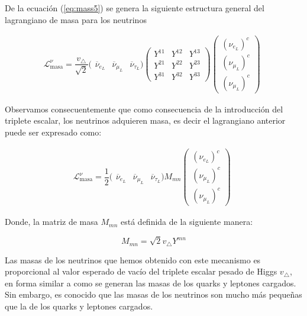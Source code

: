 \documentclass[12pt]{article}
\begin{document}
De la ecuación (\ref{eq:mass5}) se genera la siguiente estructura general del lagrangiano de masa para los neutrinos

\begin{equation*}
    \mathcal{L}^\nu_{\text{masa}}= \frac{v_\triangle}{\sqrt{2}} (\begin{array}{ccc}
         \overline{\nu}_{e_L} & \overline{\nu}_{\mu_L} & \overline{\nu}_{\tau_L} )\begin{pmatrix}    Y^{11} &  Y^{12} & Y^{13} \\
         Y^{21} &  Y^{22} & Y^{23}  \\
         Y^{31} &  Y^{32} & Y^{33}  \end{pmatrix}
  \begin{pmatrix}
         (\nu_{e_L})^c \\
         (\nu_{\mu_L})^c \\
         (\nu_{\mu_L})^c 
    \end{pmatrix}
    \end{array}
    \label{eq:mass1}
\end{equation*} 

Observamos consecuentemente que como consecuencia de la introducción del triplete escalar, los neutrinos adquieren masa, es decir el lagrangiano anterior puede ser expresado como:  

\begin{equation}
    \mathcal{L}^\nu_{\text{masa}}= \frac{1}{2} (\begin{array}{ccc}
         \overline{\nu}_{e_L} & \overline{\nu}_{\mu_L} & \overline{\nu}_{\tau_L} )M_{mn}    \begin{pmatrix}
         (\nu_{e_L})^c \\
         (\nu_{\mu_L})^c \\
         (\nu_{\mu_L})^c 
    \end{pmatrix}
    \end{array}
    \label{eq:mss2}
\end{equation} 

Donde, la matriz de masa \(M_{mn} \) está definida de la siguiente manera: 

\[M_{mn} = \sqrt{2}v_\triangle Y^{mn}\] 

Las masas de los neutrinos que hemos obtenido con este mecanismo
es proporcional al valor esperado de vacío del triplete escalar pesado de Higgs  $v_\triangle  $, en forma similar a como se generan
las masas de los quarks y leptones cargados. Sin embargo, es conocido
que las masas de los neutrinos son mucho más pequeñas que la de los
quarks y leptones cargados. \\
\end{document}
